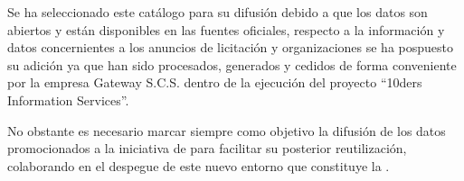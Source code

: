 Se ha seleccionado este catálogo para su difusión debido a que los datos son abiertos y están disponibles 
en las fuentes oficiales, respecto a la información y datos concernientes a los anuncios de licitación y organizaciones 
se ha pospuesto su adición ya que han sido procesados, generados y cedidos de forma conveniente por la empresa 
Gateway S.C.S. dentro de la ejecución del proyecto ``\gls{10ders} Information Services''.

No obstante es necesario marcar siempre como objetivo la difusión de los datos promocionados a la iniciativa 
de \linkeddata para facilitar su posterior reutilización, colaborando en el despegue de este nuevo entorno 
que constituye la \wode.













